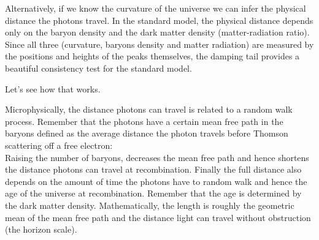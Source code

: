 \documentclass{article}
\begin{document}
Alternatively, if we know the curvature of the universe we can infer the physical distance the photons travel.  In the standard model, the physical distance depends only on the baryon density and the dark matter density (matter-radiation ratio).  Since all three (curvature, baryons density and matter radiation) are measured by the positions and heights of the peaks themselves, the damping tail provides a beautiful consistency test for the standard model.

Let's see how that works.

Microphysically, the distance photons can travel is related to a random walk process.  Remember that the photons have a certain mean free path in the baryons defined as the average distance the photon travels before Thomson scattering off a free electron:\\
Raising the number of baryons, decreases the mean free path and hence shortens the distance photons can travel at recombination.  Finally the full distance also depends on the amount of time the photons have to random walk and hence the age of the universe at recombination.  Remember that the age is determined by the dark matter density.  Mathematically, the length is roughly the geometric mean of the mean free path and the distance light can travel without obstruction (the horizon scale).
\end{document}
